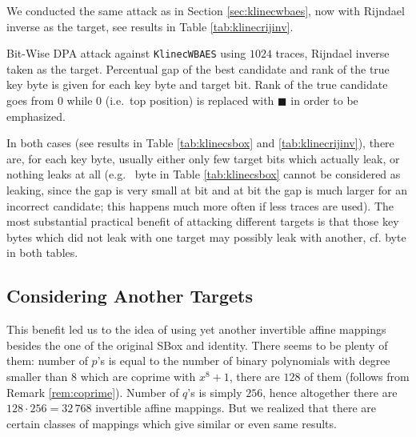 We conducted the same attack as in Section \ref{sec:klinecwbaes}, now with Rijndael inverse as the target, see results in Table \ref{tab:klinecrijinv}.

\begin{landscape}
\begin{table}[H]
	\begin{center}
	
	\end{center}
\caption{Bit-Wise DPA attack against {\tt KlinecWBAES} using $1024$ traces, Rijndael inverse taken as the target. Percentual gap of the best candidate and rank of the true key byte is given for each key byte and target bit. Rank of the true candidate goes from $0$ while $0$ (i.e.\ top position) is replaced with $\blacksquare$ in order to be emphasized.}
\label{tab:klinecrijinv}
\end{table}
\end{landscape}

In both cases (see results in Table \ref{tab:klinecsbox} and \ref{tab:klinecrijinv}), there are, for each key byte, usually either only few target bits which actually leak, or nothing leaks at all (e.g.\  byte in Table \ref{tab:klinecsbox} cannot be considered as leaking, since the gap is very small at  bit and at  bit the gap is much larger for an incorrect candidate; this happens much more often if less traces are used). The most substantial practical benefit of attacking different targets is that those key bytes which did not leak with one target may possibly leak with another, cf.  byte in both tables.

\subsection{Considering Another Targets}
\label{sec:16targets}

This benefit led us to the idea of using yet another invertible affine mappings besides the one of the original SBox and identity. There seems to be plenty of them: number of $p$'s is equal to the number of binary polynomials with degree smaller than $8$ which are coprime with $x^8+1$, there are $128$ of them (follows from Remark \ref{rem:coprime}). Number of $q$'s is simply $256$, hence altogether there are $128\cdot 256 = 32\,768$ invertible affine mappings. But we realized that there are certain classes of mappings which give similar or even same results.

